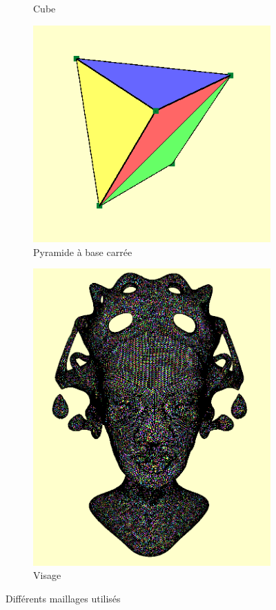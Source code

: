 \documentclass[12pt,a4paper,twoside]{report}
\begin{document}
\begin{figure}[H]
\begin{subfigure}{.45\textwidth}
		\caption{Cube}
	\end{subfigure}
	\begin{subfigure}{.45\textwidth}
		\centering
		\includegraphics[width=\textwidth]{plain_pyramide.png}
		\caption{Pyramide à base carrée}
	\end{subfigure}
	\begin{subfigure}{.45\textwidth}
		\centering
		\includegraphics[width=\textwidth]{plain_queen.png}
		\caption{Visage}
	\end{subfigure}
	\caption{Différents maillages utilisés}
	\label{fig:plain_mesh}
\end{figure}
\end{document}
